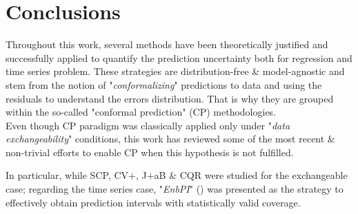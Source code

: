 \chapter{Conclusions}\label{chap:conclusions}

Throughout this work, several methods have been theoretically justified and successfully applied to quantify the prediction uncertainty both for regression and time series problem. These strategies are distribution-free \& model-agnostic and stem from the notion of "\textit{conformalizing}" predictions to data and using the residuals to understand the errors distribution. That is why they are grouped within the so-called "conformal prediction" (CP) methodologies.\\

Even though CP paradigm was classically applied only under "\textit{data exchangeability}" conditions, this work has reviewed some of the most recent \& non-trivial efforts to enable CP when this hypothesis is not fulfilled. 

In particular, while SCP, CV$+$, J$+$aB \& CQR were studied for the exchangeable case; regarding the time series case, "\textit{EnbPI}" (\cite{chenxu2021a}) was presented as the strategy to effectively obtain prediction intervals with statistically valid coverage.

